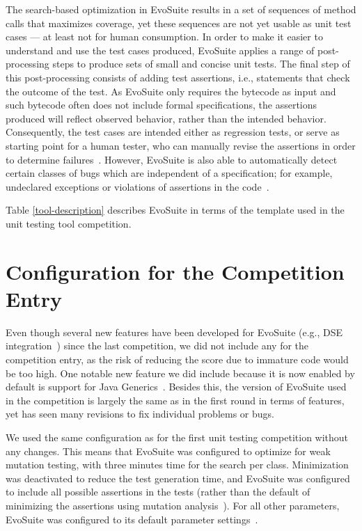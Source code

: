 \documentclass[runningheads,a4paper]{llncs}
\newcommand{\EVOSUITE}{{\sc EvoSuite}\xspace}
\begin{document}
The search-based optimization in \EVOSUITE results in a set of
sequences of method calls that maximizes coverage, yet these sequences
are not yet usable as unit test cases --- at least not for human
consumption. In order to make it easier to understand and use the test
cases produced, \EVOSUITE applies a range of post-processing steps to
produce sets of small and concise unit tests. The final step of this
post-processing consists of adding test assertions, i.e., statements
that check the outcome of the test. As \EVOSUITE only requires the
bytecode as input and such bytecode often does not include formal specifications, 
the assertions
produced will reflect observed behavior, rather than the intended
behavior. Consequently, the test cases are intended either as
regression tests, or serve as starting point for a human tester, who
can manually revise the assertions in order to determine
failures~\cite{10.1109/TSE.2011.93}. However, \EVOSUITE is also able
to automatically detect certain classes of bugs which are independent
of a specification; for example, undeclared exceptions or violations
of assertions in the code~\cite{emse13_oracle}.

Table \ref{tool-description} describes \EVOSUITE in terms of the
template used in the unit testing tool competition.



\section{Configuration for the Competition Entry}

Even though several new features have been developed for \EVOSUITE
(e.g., DSE integration~\cite{evoISSRE113}) since the last competition,
we did not include any for the competition entry, as the risk of
reducing the score due to immature code would be too high. One notable
new feature we did include because it is now enabled by default is
support for Java Generics~\cite{evoGenerics13}. Besides this, the
version of \EVOSUITE used in the competition is largely the same as in
the first round in terms of features, yet has seen many revisions to
fix individual problems or bugs.

We used the same configuration as for the first unit testing
competition without any changes. This means that \EVOSUITE was
configured to optimize for weak mutation testing, with three minutes
time for the search per class. Minimization was deactivated to reduce
the test generation time, and \EVOSUITE was configured to include all
possible assertions in the tests (rather than the default of
minimizing the assertions using mutation
analysis~\cite{10.1109/TSE.2011.93}). For all other parameters,
\EVOSUITE was configured to its default parameter
settings~\cite{arcuri2013parameter}.
\end{document}
